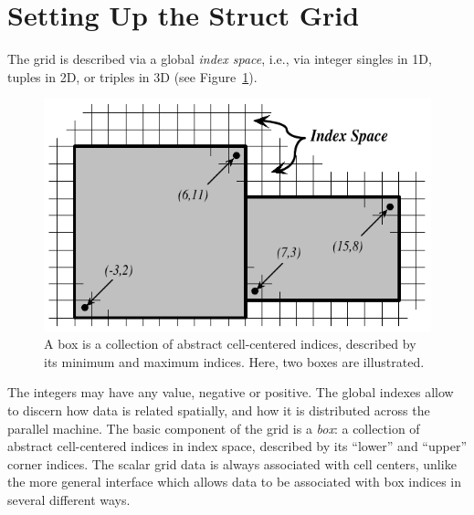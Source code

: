 
\section{Setting Up the Struct Grid}
\label{sec-Struct-Grid}

The grid is described via a global {\em index space}, i.e., via integer singles
in 1D, tuples in 2D, or triples in 3D (see Figure~\ref{fig-struct-boxes}).
\begin{figure}
\centering
\includegraphics[width=.5\textwidth]{figStructGridBoxes}
\caption{%
A box is a collection of abstract cell-centered indices, described by its
minimum and maximum indices.  Here, two boxes are illustrated.}
\label{fig-struct-boxes}
\end{figure}
The integers may have any value, negative or positive.  The global indexes
allow \hypre{} to discern how data is related spatially, and how it is
distributed across the parallel machine.  The basic component of the grid is a
{\em box}: a collection of abstract cell-centered indices in index space,
described by its ``lower'' and ``upper'' corner indices.  The scalar grid data
is always associated with cell centers, unlike the more general 
interface which allows data to be associated with box indices in several
different ways.

